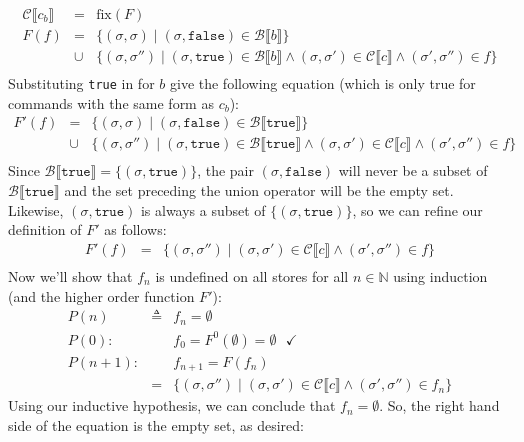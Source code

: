 \documentclass[10pt, oneside]{article}
\begin{document}
\begin{enumerate}[1.]
\begin{enumerate} [(a)]
      \begin{eqnarray*}
        \mathcal{C} \llbracket c_b \rrbracket & = & \text{fix}(F) \\
        F(f) & = & \{ (\sigma, \sigma) \mid (\sigma, \texttt{false}) \in 
                                           \mathcal{B} \llbracket b \rrbracket \}\\
            & \cup & \{(\sigma, \sigma'') 
               \mid (\sigma, \texttt{true}) \in \mathcal{B} \llbracket b\rrbracket
             \wedge (\sigma, \sigma') \in \mathcal{C} \llbracket c \rrbracket 
             \wedge (\sigma', \sigma'') \in f \} \\
      \end{eqnarray*}
      Substituting \texttt{true} in for $b$ give the following equation (which is 
      only true for commands with the same form as $c_b$):
      \begin{eqnarray*}
        F'(f) & = & \{ (\sigma, \sigma) \mid (\sigma, \texttt{false}) \in 
                               \mathcal{B} \llbracket \texttt{true} \rrbracket \}\\
            & \cup & \{(\sigma, \sigma'') 
    \mid (\sigma, \texttt{true}) \in \mathcal{B} \llbracket \texttt{true}\rrbracket
             \wedge (\sigma, \sigma') \in \mathcal{C} \llbracket c \rrbracket 
             \wedge (\sigma', \sigma'') \in f \} \\
      \end{eqnarray*} 
      Since $\mathcal{B} \llbracket \texttt{true} \rrbracket = \{(\sigma, 
      \texttt{true})\}$, the pair $(\sigma, \texttt{false})$ will never be a subset 
      of $\mathcal{B} \llbracket \texttt{true} \rrbracket$ and the set preceding 
      the union operator will be the empty set. Likewise, $(\sigma, \texttt{true})$ 
      is always a subset of $\{(\sigma, \texttt{true})\}$, so we can refine our 
      definition of $F'$ as follows:
            \begin{eqnarray*}
        F'(f) & = &  \{(\sigma, \sigma'') 
    					    \mid (\sigma, \sigma') \in \mathcal{C} \llbracket c \rrbracket 
                \wedge (\sigma', \sigma'') \in f \} \\
      \end{eqnarray*} 
      Now we'll show that $f_n$ is undefined on all stores for all $n \in
      \mathbb{N}$ using induction (and the higher order function $F'$):
      \begin{eqnarray*}
        P(n)  & \triangleq & f_n = \emptyset \\
        P(0): & & f_0 = F^0(\emptyset) = \emptyset \text{ } \checkmark \\
        P(n+1): & & f_{n+1} = F(f_n) \\
                & = & \{(\sigma, \sigma'') 
    					    \mid (\sigma, \sigma') \in \mathcal{C} \llbracket c \rrbracket 
                \wedge (\sigma', \sigma'') \in f_n \}
      \end{eqnarray*}
      Using our inductive hypothesis, we can conclude that $f_n = \emptyset$. So, the right hand side of the equation
      is the empty set, as desired:
      

\end{enumerate}
\end{enumerate}
\end{document}
